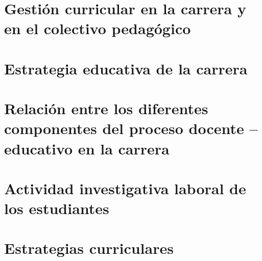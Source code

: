 \section{Gestión curricular en la carrera y en el colectivo pedagógico}



\section{Estrategia educativa de la carrera}



\section{Relación entre los diferentes componentes del proceso docente – educativo en la carrera}



\section{Actividad investigativa laboral de los estudiantes}



\section{Estrategias curriculares }

